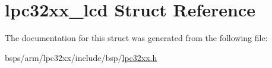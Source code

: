 \hypertarget{structlpc32xx__lcd}{}\section{lpc32xx\+\_\+lcd Struct Reference}
\label{structlpc32xx__lcd}


The documentation for this struct was generated from the following file\+:\begin{DoxyCompactItemize}
\item 
bsps/arm/lpc32xx/include/bsp/\mbox{\hyperlink{lpc32xx_8h}{lpc32xx.\+h}}\end{DoxyCompactItemize}
